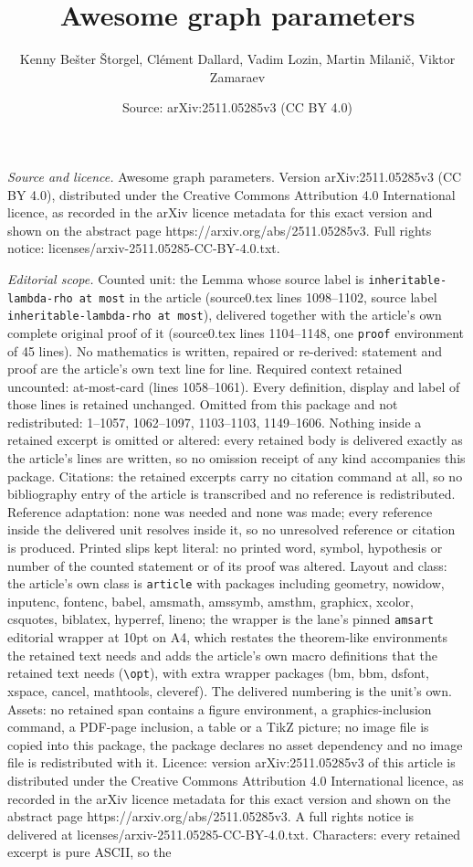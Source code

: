 \documentclass[10pt,a4paper]{amsart}
\title[Awesome graph parameters]{Awesome graph parameters}
\author{Kenny Be\v{s}ter \v{S}torgel, Cl\'ement Dallard, Vadim Lozin, Martin Milani\v{c}, Viktor Zamaraev}
\date{Source: arXiv:2511.05285v3 (CC BY 4.0)}
\begin{document}
\maketitle

\noindent\emph{Source and licence.} Awesome graph parameters. Version arXiv:2511.05285v3 (CC BY 4.0), distributed under the Creative Commons Attribution 4.0 International licence, as recorded in the arXiv licence metadata for this exact version and shown on the abstract page https://arxiv.org/abs/2511.05285v3. Full rights notice: licenses/arxiv-2511.05285-CC-BY-4.0.txt.\par\smallskip

\noindent\textit{Editorial scope.} Counted unit: the Lemma whose source label is \texttt{inheritable-lambda-rho at most} in the article (source0.tex lines 1098--1102, source label \texttt{inheritable-lambda-rho at most}), delivered together with the article's own complete original proof of it (source0.tex lines 1104--1148, one \texttt{proof} environment of 45 lines). No mathematics is written, repaired or re-derived: statement and proof are the article's own text line for line. Required context retained uncounted: at-most-card (lines 1058--1061). Every definition, display and label of those lines is retained unchanged. Omitted from this package and not redistributed: 1--1057, 1062--1097, 1103--1103, 1149--1606. Nothing inside a retained excerpt is omitted or altered: every retained body is delivered exactly as the article's lines are written, so no omission receipt of any kind accompanies this package. Citations: the retained excerpts carry no citation command at all, so no bibliography entry of the article is transcribed and no reference is redistributed. Reference adaptation: none was needed and none was made; every reference inside the delivered unit resolves inside it, so no unresolved reference or citation is produced. Printed slips kept literal: no printed word, symbol, hypothesis or number of the counted statement or of its proof was altered. Layout and class: the article's own class is \texttt{article} with packages including geometry, nowidow, inputenc, fontenc, babel, amsmath, amssymb, amsthm, graphicx, xcolor, csquotes, biblatex, hyperref, lineno; the wrapper is the lane's pinned \texttt{amsart} editorial wrapper at 10pt on A4, which restates the theorem-like environments the retained text needs and adds the article's own macro definitions that the retained text needs (\texttt{\textbackslash opt}), with extra wrapper packages (bm, bbm, dsfont, xspace, cancel, mathtools, cleveref). The delivered numbering is the unit's own. Assets: no retained span contains a figure environment, a graphics-inclusion command, a PDF-page inclusion, a table or a TikZ picture; no image file is copied into this package, the package declares no asset dependency and no image file is redistributed with it. Licence: version arXiv:2511.05285v3 of this article is distributed under the Creative Commons Attribution 4.0 International licence, as recorded in the arXiv licence metadata for this exact version and shown on the abstract page https://arxiv.org/abs/2511.05285v3. A full rights notice is delivered at licenses/arxiv-2511.05285-CC-BY-4.0.txt. Characters: every retained excerpt is pure ASCII, so the 
\end{document}
